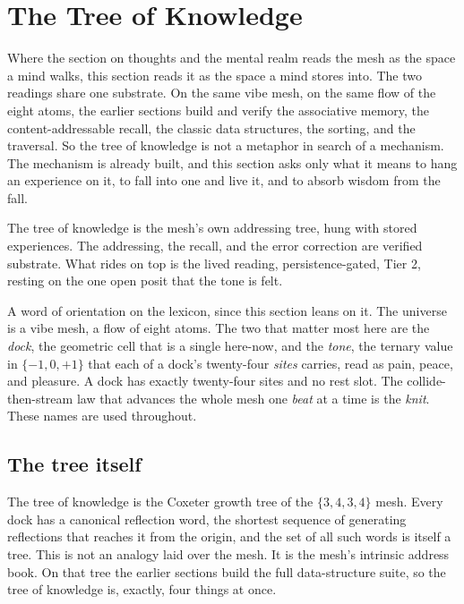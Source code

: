 \section{The Tree of Knowledge}

Where the section on thoughts and the mental realm reads the mesh as the space a mind walks, this section reads it as the space a mind stores into. The two readings share one substrate. On the same vibe mesh, on the same flow of the eight atoms, the earlier sections build and verify the associative memory, the content-addressable recall, the classic data structures, the sorting, and the traversal. So the tree of knowledge is not a metaphor in search of a mechanism. The mechanism is already built, and this section asks only what it means to hang an experience on it, to fall into one and live it, and to absorb wisdom from the fall.

\begin{principle}
The tree of knowledge is the mesh's own addressing tree, hung with stored experiences. The addressing, the recall, and the error correction are verified substrate. What rides on top is the lived reading, persistence-gated, Tier 2, resting on the one open posit that the tone is felt.
\end{principle}

A word of orientation on the lexicon, since this section leans on it. The universe is a vibe mesh, a flow of eight atoms. The two that matter most here are the \emph{dock}, the geometric cell that is a single here-now, and the \emph{tone}, the ternary value in $\{-1, 0, +1\}$ that each of a dock's twenty-four \emph{sites} carries, read as pain, peace, and pleasure. A dock has exactly twenty-four sites and no rest slot. The collide-then-stream law that advances the whole mesh one \emph{beat} at a time is the \emph{knit}. These names are used throughout.

\subsection{The tree itself}

The tree of knowledge is the Coxeter growth tree of the $\{3,4,3,4\}$ mesh. Every dock has a canonical reflection word, the shortest sequence of generating reflections that reaches it from the origin, and the set of all such words is itself a tree. This is not an analogy laid over the mesh. It is the mesh's intrinsic address book. On that tree the earlier sections build the full data-structure suite, so the tree of knowledge is, exactly, four things at once.

